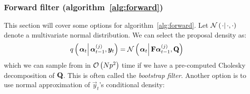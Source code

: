 \subsubsection*{Forward filter (algorithm~\ref{alg:forward})}
This section will cover some options for algorithm~\ref{alg:forward}. Let $\normalC{\cdot}{\cdot}{\cdot}$ denote a multivariate normal distribution. We can select the proposal density as:
\begin{equation}
	\IDC{\vec{\alpha}_t}{\partic{\vec{\alpha}}{t-1}{j}, \vec{y}_t} = %
		\normalC{\vec{\alpha}_t}{\mat{F}\partic{\vec{\alpha}}{t-1}{j}}{\mat{Q}}
\end{equation}%
%
which we can sample from in $\mathcal{O}\left( Np^2\right)$ time if we have a pre-computed Cholesky decomposition of $\mathbf{Q}$. This is often called the \emph{bootstrap filter}. Another option is to use normal approximation of $\vec{y}_t$'s conditional density:

